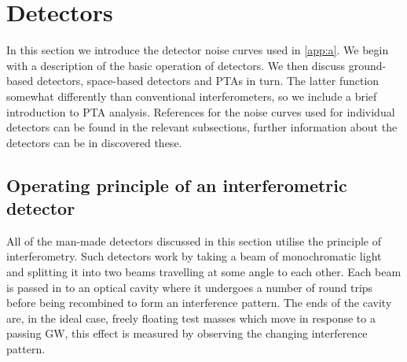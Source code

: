 \section{Detectors}\label{sec:detectors}

In this section we introduce the detector noise curves used in \ref{app:a}. We begin with a description of the basic operation of detectors. We then discuss ground-based detectors, space-based detectors and PTAs in turn. The latter function somewhat differently than conventional interferometers, so we include a brief introduction to PTA analysis. References for the noise curves used for individual detectors can be found in the relevant subsections, further information about the detectors can be in discovered these.

\subsection{Operating principle of an interferometric detector}\label{sec:principles}

All of the man-made detectors discussed in this section utilise the principle of interferometry. Such detectors work by taking a beam of monochromatic light and splitting it into two beams travelling at some angle to each other. Each beam is passed in to an optical cavity where it undergoes a number of round trips before being recombined to form an interference pattern. The ends of the cavity are, in the ideal case, freely floating test masses which move in response to a passing GW, this effect is measured by observing the changing interference pattern.

